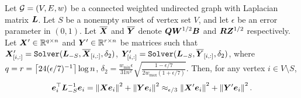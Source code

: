 \documentclass[10pt,twocolumn,twoside]{IEEEtran}
\begin{document}
\begin{lemma}\label{lem:approx-denom}
    Let \(\mathcal{G}=(V,E,w)\) be a connected weighted undirected graph with Laplacian matrix \(\boldsymbol{L}\). Let  \(S\) be a nonempty subset of vertex set $V$, and let  $\epsilon$ be an error parameter in $(0,1)$. Let  \(\overline{\boldsymbol{X}}\) and \(\overline{\boldsymbol{Y}}\)   denote \(\boldsymbol{Q}\boldsymbol{W}^{1/2}\boldsymbol{B}\) and \(\boldsymbol{R}\boldsymbol{Z}^{1/2}\) respectively.   Let \(\boldsymbol{X}'\in\mathbb{R}^{q\times n}\) and \(\boldsymbol{Y}'\in\mathbb{R}^{r\times n}\) be matrices such that \(\boldsymbol{X}'_{[i,:]}=\mathtt{Solver}(\boldsymbol{L}_{-S},\overline{\boldsymbol{X}}_{[i,:]},\delta_2)\), \(\boldsymbol{Y}'_{[i,:]}=\mathtt{Solver}(\boldsymbol{L}_{-S},\overline{\boldsymbol{Y}}_{[i,:]},\delta_2)\), where \(q=r=\left\lceil24(\epsilon/7)^{-1}\right\rceil\log n\), \(\delta_2=\frac{w_{\min}\epsilon}{31n^2}\sqrt{\frac{1-\epsilon/7}{2w_{\max}(1+\epsilon/7)}}\). Then, for any vertex \(i\in V\setminus S\),
    \begin{equation}\label{eq:approx-denom}
        \boldsymbol{e}_i^\top\boldsymbol{L}_{-S}^{-1}\boldsymbol{e}_i = \left\Vert\boldsymbol{X}\boldsymbol{e}_i\right\Vert^2+\left\Vert\boldsymbol{Y}\boldsymbol{e}_i\right\Vert^2 \approx_{\epsilon/3}\left\Vert\boldsymbol{X}'\boldsymbol{e}_i\right\Vert^2+\left\Vert\boldsymbol{Y}'\boldsymbol{e}_i\right\Vert^2.
    \end{equation}
\end{lemma}
\end{document}
